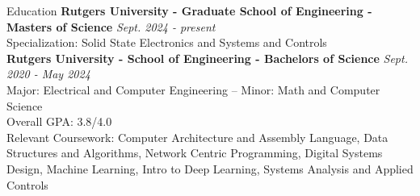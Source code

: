 \documentclass{resume}
\begin{document}
    \vspace{-2mm}
    \begin{rSection}{Education}
        {\bf  Rutgers University - Graduate School of Engineering - Masters of Science} \hfill {\em Sept. 2024 - present} \\
        Specialization: Solid State Electronics and Systems and Controls \\
        {\bf Rutgers University - School of Engineering - Bachelors of Science} \hfill {\em Sept. 2020 - May 2024} \\
        Major: Electrical and Computer Engineering -- Minor: Math and Computer Science \\
        Overall GPA: 3.8/4.0
        \\
        Relevant Coursework:
            Computer Architecture and Assembly Language,
            Data Structures and Algorithms,
            Network Centric Programming,
            Digital Systems Design,
            Machine Learning,
            Intro to Deep Learning,
            Systems Analysis and Applied Controls

    \end{rSection}
    \vspace{-2mm}

\end{document}
